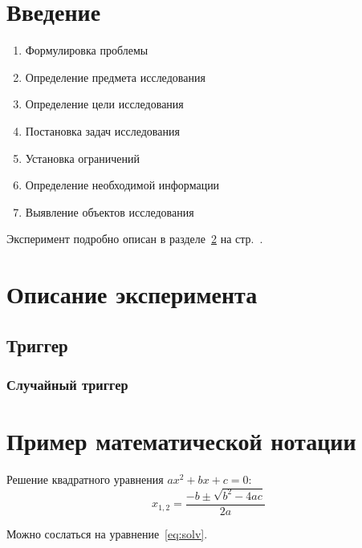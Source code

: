 \documentclass[12pt,a4paper]{scrartcl}
\begin{document}
\section{Введение}
\label{sec:intro}

\begin{enumerate}
 \item Формулировка проблемы
 \item Определение предмета исследования
 \item Определение цели исследования
 \item Постановка задач исследования
 \item Установка ограничений
 \item Определение необходимой информации
 \item Выявление объектов исследования
\end{enumerate}

Эксперимент подробно описан в разделе~\ref{sec:exp} на
стр.~\pageref{sec:exp}.

\section{Описание эксперимента}
\label{sec:exp}

\subsection{Триггер}
\label{sec:exp:trigger}

\subsubsection{Случайный триггер}
\label{sec:exp:trigger:rnd}


\section{Пример математической нотации}
\label{sec:mathexample}

Решение квадратного уравнения \(ax^2+bx+c=0\):
\begin{equation}\label{eq:solv}
 x_{1,2}=\frac{-b\pm\sqrt{b^2-4ac}}{2a}
\end{equation}

Можно сослаться на уравнение~\eqref{eq:solv}.
\end{document}
